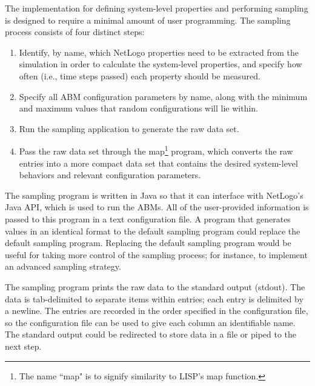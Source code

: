The \fw implementation for defining system-level properties and performing sampling is designed to require a minimal amount of user programming.
The sampling process consists of four distinct steps:
\begin{enumerate}
\item Identify, by name, which NetLogo properties need to be extracted from the simulation in order to calculate the system-level properties, and specify how often (i.e., time steps passed) each property should be measured.
\item Specify all ABM configuration parameters by name, along with the minimum and maximum values that random configurations will lie within.
\item Run the sampling application to generate the raw data set.
\item Pass the raw data set through the map\footnote{The name ``map" is to signify similarity to LISP's map function.} program, which converts the raw entries into a more compact data set that contains the desired system-level behaviors and relevant configuration parameters.
\end{enumerate}

The sampling program is written in Java so that it can interface with NetLogo's Java API, which is used to run the ABMs.
All of the user-provided information is passed to this program in a text configuration file.
A program that generates values in an identical format to the default sampling program could replace the default sampling program.
Replacing the default sampling program would be useful for taking more control of the sampling process; for instance, to implement an advanced sampling strategy.

The sampling program prints the raw data to the standard output (stdout).
The data is tab-delimited to separate items within entries; each entry is delimited by a newline.
The entries are recorded in the order specified in the configuration file, so the configuration file can be used to give each column an identifiable name.
The standard output could be redirected to store data in a file or piped to the next step.


